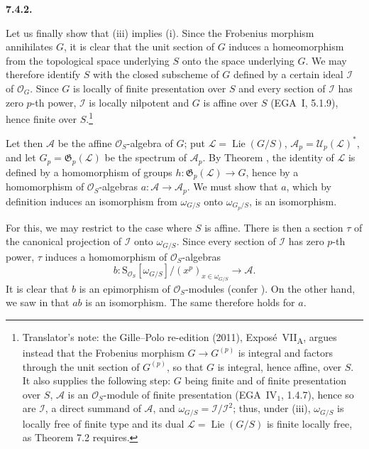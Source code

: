 \medskip
\noindent\textbf{7.4.2.}
\label{sga3:VIIA:7.4.2}

Let us finally show that (iii) implies (i). Since the Frobenius morphism
annihilates \(G\), it is clear that the unit section of \(G\) induces a
homeomorphism from the topological space underlying \(S\) onto the space
underlying \(G\). We may therefore identify \(S\) with the closed
subscheme of \(G\) defined by a certain ideal \(\mathcal I\) of
\(\mathcal O_G\). Since \(G\) is locally of finite presentation over \(S\)
and every section of \(\mathcal I\) has zero \(p\)-th power,
\(\mathcal I\) is locally nilpotent and \(G\) is affine over \(S\)
(EGA~I, 5.1.9), hence finite over \(S\).\footnote{Translator's note: the
Gille--Polo re-edition (2011), Expos\'e~VII\textsubscript{A}, argues
instead that the Frobenius morphism \(G\to G^{(p)}\) is integral and
factors through the unit section of \(G^{(p)}\), so that \(G\) is
integral, hence affine, over \(S\). It also supplies the following step:
\(G\) being finite and of finite presentation over \(S\), \(\mathcal A\)
is an \(\mathcal O_S\)-module of finite presentation
(EGA~IV\(_1\), 1.4.7), hence so are \(\mathcal I\), a direct summand of
\(\mathcal A\), and \(\omega_{G/S}=\mathcal I/\mathcal I^2\); thus, under
(iii), \(\omega_{G/S}\) is locally free of finite type and its dual
\(\mathcal L=\operatorname{Lie}(G/S)\) is finite locally free, as Theorem
7.2 requires.}

Let then \(\mathcal A\) be the affine \(\mathcal O_S\)-algebra of \(G\);
put \(\mathcal L=\operatorname{Lie}(G/S)\),
\(\mathcal A_p=\mathcal U_p(\mathcal L)^{*}\), and let
\(G_p=\mathfrak G_p(\mathcal L)\) be the spectrum of \(\mathcal A_p\). By
Theorem , the identity of \(\mathcal L\) is defined by a
homomorphism of groups \(h:\mathfrak G_p(\mathcal L)\to G\), hence by a
homomorphism of \(\mathcal O_S\)-algebras
\(a:\mathcal A\to\mathcal A_p\). We must show that \(a\), which by
definition induces an isomorphism from \(\omega_{G/S}\) onto
\(\omega_{G_p/S}\), is an isomorphism.

For this, we may restrict to the case where \(S\) is affine. There is
then a section \(\tau\) of the canonical projection of \(\mathcal I\) onto
\(\omega_{G/S}\). Since every section of \(\mathcal I\) has zero
\(p\)-th power, \(\tau\) induces a homomorphism of
\(\mathcal O_S\)-algebras
\[
  b:\mathrm S_{\mathcal O_S}[\omega_{G/S}]/(x^p)_{x\in\omega_{G/S}}
  \longrightarrow\mathcal A.
\]
It is clear that \(b\) is an epimorphism of \(\mathcal O_S\)-modules
(confer ). On the other hand, we saw in  that \(ab\) is
an isomorphism. The same therefore holds for \(a\).

